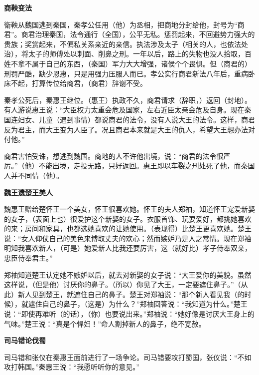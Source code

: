 \documentclass[12pt,UTF-8,openany,a4]{ctexbook}
\begin{document}
\begin{large}
    \yiwen 
    \begin{center}{\Large\textbf{商鞅变法}}\end{center}
    
    衛鞅从魏国逃到秦国，秦孝公任用（他）为丞相，把商地分封给他，封号为“商君”。商君治理秦国，法令通行（全国），公平无私。惩罚起来，不回避势力强大的贵族；奖赏起来，不偏私关系亲近的亲信。执法涉及太子（相关的人，也依法处治），将太子的师傅处以刺面、削鼻之刑。一年以后，路上的失物也没人拾取，百姓不拿不属于自己的东西，（秦国）军力大大增强，诸侯个个畏惧。但（商君的）刑罚严酷，缺少恩惠，只是用强力压服人而已。孝公实行商君新法八年后，重病卧床不起，打算传位给商君，（商君）辞谢不受。
    
    秦孝公死后，秦惠王继位。（惠王）执政不久，商君请求（辞职，）返回（封地）。有人游说惠王说：“大臣权力太重会危及国家，左右近臣太亲会危及自身。现在秦国连妇女、儿童（遇到事情）都说商君的法令，没有人说大王的法令。这样，商君反为君主，而大王变为人臣了。况且商君本来就是大王的仇人，希望大王想办法对付他。”
    
    商君害怕受诛，想逃到魏国。商地的人不许他出境，说：“商君的法令很严厉。”（他）不能出境，走投无路，只好返回。惠王即以车裂之刑处死了他，而秦国人并不同情（他）。
    
    \begin{center}{\Large\textbf{魏王遗楚王美人}}\end{center}
    
    魏惠王赠给楚怀王一个美女，怀王很喜欢她。怀王的夫人郑袖，知道怀王宠爱新娶的女子，（表面上也）很爱护这个新娶的女子。衣服首饰、玩耍爱好，都挑她喜欢的来；房间和家具，也都选她喜欢的让她使用。（表现得）比楚王更喜欢她。楚王说：“女人仰仗自己的美色来博取丈夫的欢心；然而嫉妒乃是人之常情。现在郑袖明知我喜欢新人，（可是）她爱新人比我还要厉害，这（就好比）孝子侍奉双亲，忠臣侍奉君主。”
    
    郑袖知道楚王认定她不嫉妒以后，就去对新娶的女子说：“大王爱你的美貌。虽然这样说，（但是他）讨厌你的鼻子。（所以）你见了大王，一定要遮住鼻子。”（从此）新人见到楚王，就遮住自己的鼻子。楚王对郑袖说：“那个新人看见我（的时候），就遮住自己的鼻子，（这是）为什么？”郑袖回答说：“我知道为什么。”楚王说：“即使再难听（的话），（你）也要说出来。”郑袖说：“她好像是讨厌大王身上的气味。”楚王说：“真是个悍妇！”命人割掉新人的鼻子，绝不宽赦。
    
    \begin{center}{\Large\textbf{司马错论伐蜀}}\end{center}
    
    司马错和张仪在秦惠王面前进行了一场争论。司马错要攻打蜀国，张仪说：“不如攻打韩国。”秦惠王说：“我愿听听你的意见。”
    

\end{large}
\end{document}
